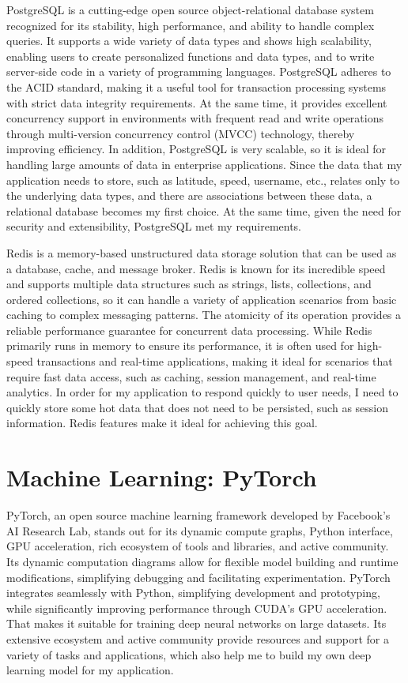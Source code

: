\documentclass[12pt,two side]{report}
\begin{document}
PostgreSQL is a cutting-edge open source object-relational database system recognized for its stability, high performance, and ability to handle complex queries. It supports a wide variety of data types and shows high scalability, enabling users to create personalized functions and data types, and to write server-side code in a variety of programming languages. PostgreSQL adheres to the ACID standard, making it a useful tool for transaction processing systems with strict data integrity requirements. At the same time, it provides excellent concurrency support in environments with frequent read and write operations through multi-version concurrency control (MVCC) technology, thereby improving efficiency. In addition, PostgreSQL is very scalable, so it is ideal for handling large amounts of data in enterprise applications. Since the data that my application needs to store, such as latitude, speed, username, etc., relates only to the underlying data types, and there are associations between these data, a relational database becomes my first choice. At the same time, given the need for security and extensibility, PostgreSQL met my requirements.\newline

Redis is a memory-based unstructured data storage solution that can be used as a database, cache, and message broker. Redis is known for its incredible speed and supports multiple data structures such as strings, lists, collections, and ordered collections, so it can handle a variety of application scenarios from basic caching to complex messaging patterns. The atomicity of its operation provides a reliable performance guarantee for concurrent data processing. While Redis primarily runs in memory to ensure its performance, it is often used for high-speed transactions and real-time applications, making it ideal for scenarios that require fast data access, such as caching, session management, and real-time analytics. In order for my application to respond quickly to user needs, I need to quickly store some hot data that does not need to be persisted, such as session information. Redis features make it ideal for achieving this goal.

\section{Machine Learning: PyTorch}
PyTorch, an open source machine learning framework developed by Facebook's AI Research Lab, stands out for its dynamic compute graphs, Python interface, GPU acceleration, rich ecosystem of tools and libraries, and active community. Its dynamic computation diagrams allow for flexible model building and runtime modifications, simplifying debugging and facilitating experimentation. PyTorch integrates seamlessly with Python, simplifying development and prototyping, while significantly improving performance through CUDA's GPU acceleration. That makes it suitable for training deep neural networks on large datasets. Its extensive ecosystem and active community provide resources and support for a variety of tasks and applications, which also help me to build my own deep learning model for my application.
\end{document}

